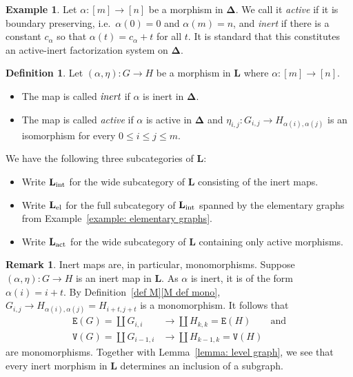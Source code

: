 \documentclass{amsart}
\numberwithin{theorem}{subsection}
\theoremstyle{definition}
\newtheorem{definition}[theorem]{Definition}
\newtheorem{example}[theorem]{Example}
\newtheorem{remark}[theorem]{Remark}
\newcommand{\name}[1]{\ensuremath{\text{\textup{#1}}}}
\newcommand{\simp}{\mathbf{\Delta}}
\newcommand{\levelg}{\mathbf{L}}
\newcommand{\levelint}{\levelg_{\name{int}}}
\newcommand{\levelel}{\levelg_{\name{el}}}
\newcommand{\edge}{\mathtt{E}}
\newcommand{\vertex}{\mathtt{V}}
\begin{document}
\begin{example}\label{ex simpfactsys}
Let $\alpha\colon [m]\to [n]$ be a morphism in $\simp$. We call it \emph{active} if it is boundary preserving, i.e.\ $\alpha(0)=0$ and $\alpha(m)=n$, and \emph{inert} if there is a constant $c_\alpha$ so that $\alpha(t) = c_\alpha + t$ for all $t$. 
It is standard that this constitutes an active-inert factorization system on $\simp$.
\end{example}

\begin{definition}\label{definition: int and el}
Let $(\alpha, \eta) \colon G \to H$ be a morphism in $\levelg$ where $\alpha\colon [m]\to [n]$.
\begin{itemize}
\item The map is called $\emph{inert}$ if $\alpha$ is inert in $\simp$.
\item The map is called \emph{active} if $\alpha$ is active in $\simp$ and $\eta_{i,j} \colon G_{i,j} \to H_{\alpha(i), \alpha(j)}$ is an isomorphism for every $0\leq i\leq j\leq m$.
\end{itemize} 
We have the following three subcategories of $\levelg$:
\begin{itemize}
\item Write $\levelint$ for the wide subcategory of $\levelg$ consisting of the inert maps.
\item Write $\levelel$ for the full subcategory of $\levelint$ spanned by the elementary graphs from Example~\ref{example: elementary graphs}.
\item Write $\levelg_{\name{act}}$ for the wide subcategory of $\levelg$ containing only active morphisms.
\end{itemize}
\end{definition}

\begin{remark}\label{rem underlying graph}
Inert maps are, in particular, monomorphisms.
Suppose $(\alpha, \eta) \colon G \to H$ is an inert map in $\levelg$. 
As $\alpha$ is inert, it is of the form $\alpha(i) = i + t$.
By Definition~\ref{def M}\eqref{M def mono}, $G_{i, j} \to H_{\alpha(i),\alpha(j)} = H_{i+t,j+t}$ is a monomorphism.
It follows that 
\begin{align*} 
\edge(G) = \coprod G_{i,i} &\to \coprod H_{k,k} = \edge(H)  & \text{and} \\
\vertex(G) = \coprod G_{i-1,i} &\to \coprod H_{k-1,k} = \vertex(H)
\end{align*} are monomorphisms.  
Together with Lemma~\ref{lemma: level graph}, we see that every inert morphism in $\levelg$ determines an inclusion of a subgraph.
\end{remark}
\end{document}
